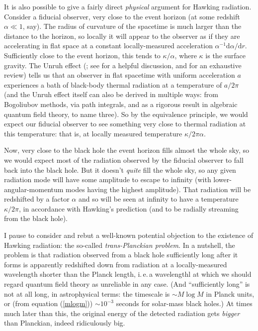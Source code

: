 \documentclass[12pt]{article}
\newcommand{\iec}{\mbox{i.\,e.\,}}
\begin{document}
 It is also possible to give a fairly direct \emph{physical} argument for Hawking radiation. Consider a fiducial observer, very close to the event horizon (at some redshift $\alpha \ll 1$, say). The radius of curvature of the spacetime is much larger than the distance to the horizon, so locally it will appear to the observer as if they are accelerating in flat space at a constant locally-measured acceleration $\alpha^{-1}\mathrm{d}\alpha/\mathrm{d}r$. Sufficiently close to the event horizon, this tends to $\kappa/\alpha$, where $\kappa$ is the surface gravity. 
 The Unruh effect (; see  for a helpful discussion, and  for an exhaustive review) tells us that an observer in flat spacetime with uniform acceleration $a$ experiences a bath of black-body thermal radiation at a temperature of $a/2 \pi$ (and the Unruh effect itself can also be derived in multiple ways: from Bogoliubov methods, via path integrals, and as a rigorous result in algebraic quantum field theory, to name three). So by the equivalence principle, we would expect our fiducial observer to see something very close to thermal radiation at this temperature: that is, at locally measured temperature $\kappa/2\pi \alpha$.
 
 Now, very close to the black hole the event horizon fills almost the whole sky, so we would expect most of the radiation observed by the fiducial observer to fall back into the black hole. But it doesn't \emph{quite} fill the whole sky, so any given radiation mode will have some amplitude to escape to infinity (with lower-angular-momentum modes having the highest amplitude). That radiation will be redshifted by a factor $\alpha$ and so will be seen at infinity to have a temperature $\kappa /2\pi$, in accordance with Hawking's prediction (and to be radially streaming from the black hole).
 
I pause to consider and rebut a well-known potential objection to the existence of Hawking radiation: the so-called \emph{trans-Planckian problem}. In a nutshell, the problem is that radiation observed from a black hole sufficiently long after it forms is apparently redshifted down from radiation at a locally-measured wavelength shorter than the Planck length, \iec a wavelengthl at which we should regard quantum field theory as unreliable in any case.  (And ``sufficiently long'' is not at all long, in astrophysical terms: the timescale is $\sim M \log M$ in Planck units, or (from equation (\ref{mlogm})) $\sim 10^{-3}$ seconds for solar-mass black holes.) At times much later than this, the original energy of the detected radiation gets \emph{bigger} than Planckian, indeed ridiculously big. 
 
\end{document}
